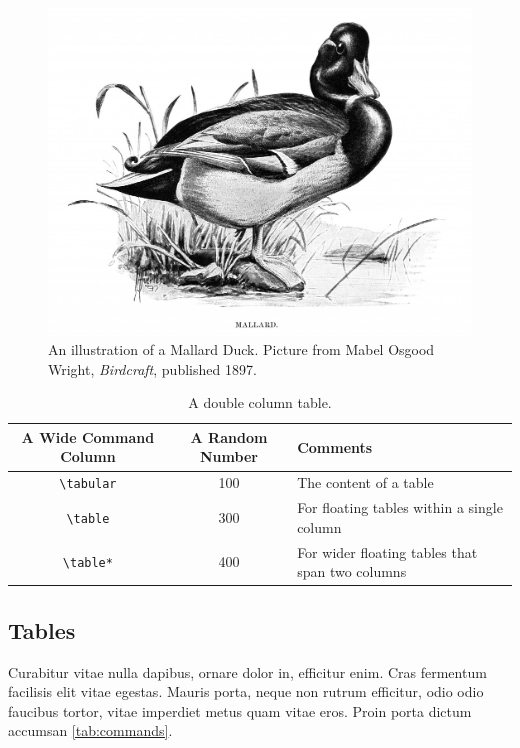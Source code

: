 \documentclass[sigconf, nonacm]{acmart}
\begin{document}
\begin{figure}
  \centering
  \includegraphics[width=\linewidth]{figures/duck}
  \caption{An illustration of a Mallard Duck. Picture from Mabel Osgood Wright, \textit{Birdcraft}, published 1897.}
  \label{fig:duck}
\end{figure}

\begin{table}[t]
  \caption{A double column table.}
  \label{tab:commands}
  \begin{tabular}{ccl}
    \toprule
    A Wide Command Column & A Random Number & Comments\\
    \midrule
    \verb|\tabular| & 100& The content of a table \\
    \verb|\table|  & 300 & For floating tables within a single column\\
    \verb|\table*| & 400 & For wider floating tables that span two columns\\
    \bottomrule
  \end{tabular}
\end{table}

\subsection{Tables}

Curabitur vitae nulla dapibus, ornare dolor in, efficitur enim. Cras fermentum facilisis elit vitae egestas. Mauris porta, neque non rutrum efficitur, odio odio faucibus tortor, vitae imperdiet metus quam vitae eros. Proin porta dictum accumsan \autoref{tab:commands}.
\end{document}
